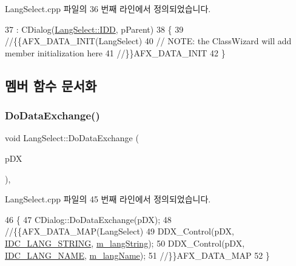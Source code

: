 Lang\+Select.\+cpp 파일의 36 번째 라인에서 정의되었습니다.


\begin{DoxyCode}
37   : CDialog(\mbox{\hyperlink{class_lang_select_af4e6d80a5f0f0e069d0e56b265244d4da5bc96450a48a899892ede71c87113aa3}{LangSelect::IDD}}, pParent)
38 \{
39   \textcolor{comment}{//\{\{AFX\_DATA\_INIT(LangSelect)}
40   \textcolor{comment}{// NOTE: the ClassWizard will add member initialization here}
41   \textcolor{comment}{//\}\}AFX\_DATA\_INIT}
42 \}
\end{DoxyCode}


\subsection{멤버 함수 문서화}
\mbox{\label{class_lang_select_aed6d5a0a1a5ffc02ac08f06cade9169a}} 
\subsubsection{\texorpdfstring{Do\+Data\+Exchange()}{DoDataExchange()}}
{\footnotesize\ttfamily void Lang\+Select\+::\+Do\+Data\+Exchange (\begin{DoxyParamCaption}\item[{C\+Data\+Exchange $\ast$}]{p\+DX }\end{DoxyParamCaption})\hspace{0.3cm}{\ttfamily [protected]}, {\ttfamily [virtual]}}



Lang\+Select.\+cpp 파일의 45 번째 라인에서 정의되었습니다.


\begin{DoxyCode}
46 \{
47   CDialog::DoDataExchange(pDX);
48   \textcolor{comment}{//\{\{AFX\_DATA\_MAP(LangSelect)}
49   DDX\_Control(pDX, \mbox{\hyperlink{resource_8h_ab057419c1495738c93ee5fdd541d8493}{IDC\_LANG\_STRING}}, \mbox{\hyperlink{class_lang_select_af75ddf60623799cb4c761692a8057b46}{m\_langString}});
50   DDX\_Control(pDX, \mbox{\hyperlink{resource_8h_a4d8bc925802d9c218314ff2314707a7f}{IDC\_LANG\_NAME}}, \mbox{\hyperlink{class_lang_select_ab18b546f12c8230292959ce2258ef240}{m\_langName}});
51   \textcolor{comment}{//\}\}AFX\_DATA\_MAP}
52 \}
\end{DoxyCode}
\mbox{\label{class_lang_select_af77cabdf85041273c5b6da89cb92508c}} 
